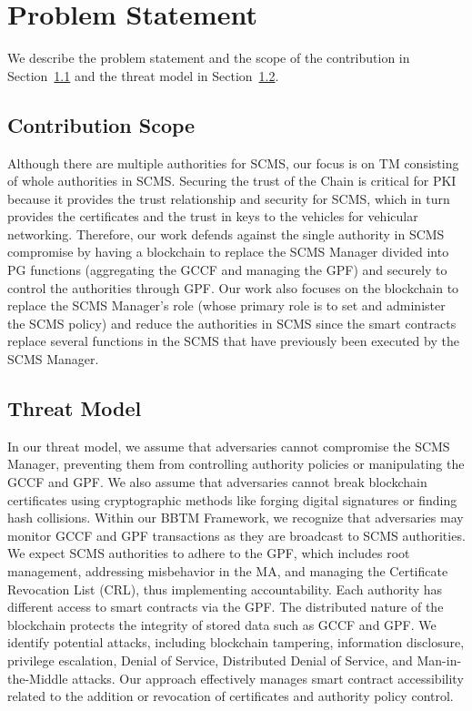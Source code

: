 \section{Problem Statement}
\label{ps}

We describe the problem statement and the scope of the contribution in Section~\ref{subsec:problem_scope} and the threat model in Section~\ref{subsec:tm}. 

\subsection{Contribution Scope}
\label{subsec:problem_scope}

Although there are multiple authorities for SCMS, our focus is on TM consisting of whole authorities in SCMS. Securing the trust of the Chain is critical for PKI because it provides the trust relationship and security for SCMS, which in turn provides the certificates and the trust in keys to the vehicles for vehicular networking. Therefore, our work defends against the single authority in SCMS compromise by having a blockchain to replace the SCMS Manager divided into PG functions (aggregating the GCCF and managing the GPF) and securely to control the authorities through GPF. Our work also focuses on the blockchain to replace the SCMS Manager's role (whose primary role is to set and administer the SCMS policy) and reduce the authorities in SCMS since the smart contracts replace several functions in the SCMS that have previously been executed by the SCMS Manager. 


\subsection{Threat Model}
\label{subsec:tm} 
In our threat model, we assume that adversaries cannot compromise the SCMS Manager, preventing them from controlling authority policies or manipulating the GCCF and GPF. We also assume that adversaries cannot break blockchain certificates using cryptographic methods like forging digital signatures or finding hash collisions. Within our BBTM Framework, we recognize that adversaries may monitor GCCF and GPF transactions as they are broadcast to SCMS authorities. We expect SCMS authorities to adhere to the GPF, which includes root management, addressing misbehavior in the MA, and managing the Certificate Revocation List (CRL), thus implementing accountability. Each authority has different access to smart contracts via the GPF. The distributed nature of the blockchain protects the integrity of stored data such as GCCF and GPF. We identify potential attacks, including blockchain tampering, information disclosure, privilege escalation, Denial of Service, Distributed Denial of Service, and Man-in-the-Middle attacks. Our approach effectively manages smart contract accessibility related to the addition or revocation of certificates and authority policy control.        

